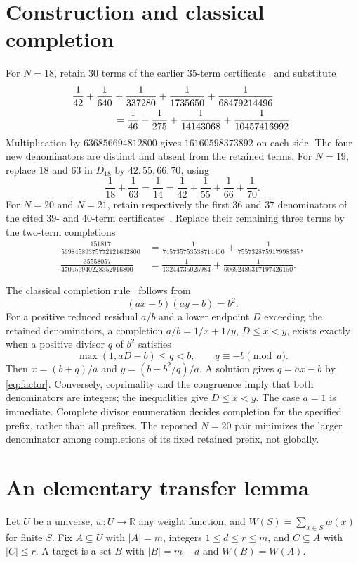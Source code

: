 \documentclass[10pt,a4paper]{article}
\newcommand{\card}[1]{\lvert #1\rvert}
\begin{document}
\section{Construction and classical completion}
For $N=18$, retain $30$ terms of the earlier $35$-term certificate~\cite{white}
and substitute
\begin{align*}
 &\frac1{42}+\frac1{640}+\frac1{337280}
     +\frac1{1735650}+\frac1{68479214496}\\
 &\hspace{15mm}=\frac1{46}+\frac1{275}
     +\frac1{14143068}+\frac1{10457416992}.
\end{align*}
Multiplication by $636856694812800$ gives $16160598373892$ on each side. The
four new denominators are distinct and absent from the retained terms. For
$N=19$, replace $18$ and $63$ in $D_{18}$ by $42,55,66,70$, using
\[
 \frac1{18}+\frac1{63}=\frac1{14}
 =\frac1{42}+\frac1{55}+\frac1{66}+\frac1{70}.
\]
For $N=20$ and $N=21$, retain respectively the first $36$ and $37$ denominators
of the cited $39$- and $40$-term certificates~\cite{grind}. Replace their remaining
three terms by the two-term completions
\begin{align*}
 \frac{151817}{56984589375772121632800}
 &=\frac1{745735753538714400}+\frac1{755732875917998385},\\
 \frac{35558057}{470956940228352916800}
 &=\frac1{13244735025984}+\frac1{60692489317197426150}.
\end{align*}

The classical completion rule~\cite{eppstein} follows from
\begin{equation}\label{eq:factor}
 (ax-b)(ay-b)=b^2.
\end{equation}
For a positive reduced residual $a/b$ and a lower endpoint $D$ exceeding the
retained denominators, a completion $a/b=1/x+1/y$, $D\leq x<y$, exists exactly
when a positive divisor $q$ of $b^2$ satisfies
\[
 \max(1,aD-b)\leq q<b,\qquad q\equiv-b\pmod a.
\]
Then $x=(b+q)/a$ and $y=(b+b^2/q)/a$. A solution gives $q=ax-b$ by
\eqref{eq:factor}. Conversely, coprimality and the congruence imply that both
denominators are integers; the inequalities give $D\leq x<y$. The case $a=1$
is immediate. Complete divisor enumeration decides completion for the specified
prefix, rather than all prefixes. The reported $N=20$ pair minimizes the larger
denominator among completions of its fixed retained prefix, not globally.

\section{An elementary transfer lemma}
Let $U$ be a universe, $w:U\to\mathbb R$ any weight function, and
$W(S)=\sum_{x\in S}w(x)$ for finite $S$. Fix $A\subseteq U$ with $\card A=m$,
integers $1\leq d\leq r\leq m$, and $C\subseteq A$ with $\card C\leq r$.
A target is a set $B$ with $\card B=m-d$ and $W(B)=W(A)$.
\end{document}

